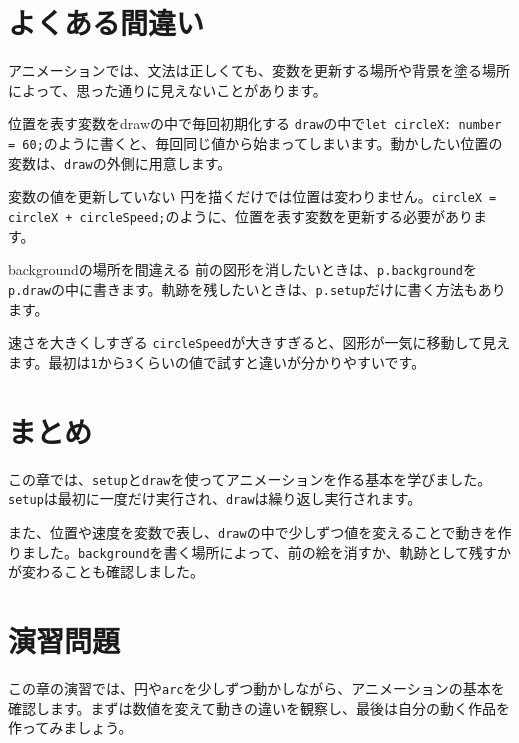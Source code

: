 \section{よくある間違い}

アニメーションでは、文法は正しくても、変数を更新する場所や背景を塗る場所によって、思った通りに見えないことがあります。

\begin{mistakebox}{位置を表す変数をdrawの中で毎回初期化する}
\texttt{draw}の中で\texttt{let circleX: number = 60;}のように書くと、毎回同じ値から始まってしまいます。動かしたい位置の変数は、\texttt{draw}の外側に用意します。
\end{mistakebox}

\begin{mistakebox}{変数の値を更新していない}
円を描くだけでは位置は変わりません。\texttt{circleX = circleX + circleSpeed;}のように、位置を表す変数を更新する必要があります。
\end{mistakebox}

\begin{mistakebox}{backgroundの場所を間違える}
前の図形を消したいときは、\texttt{p.background}を\texttt{p.draw}の中に書きます。軌跡を残したいときは、\texttt{p.setup}だけに書く方法もあります。
\end{mistakebox}

\begin{mistakebox}{速さを大きくしすぎる}
\texttt{circleSpeed}が大きすぎると、図形が一気に移動して見えます。最初は\texttt{1}から\texttt{3}くらいの値で試すと違いが分かりやすいです。
\end{mistakebox}

\section{まとめ}

この章では、\texttt{setup}と\texttt{draw}を使ってアニメーションを作る基本を学びました。\texttt{setup}は最初に一度だけ実行され、\texttt{draw}は繰り返し実行されます。

また、位置や速度を変数で表し、\texttt{draw}の中で少しずつ値を変えることで動きを作りました。\texttt{background}を書く場所によって、前の絵を消すか、軌跡として残すかが変わることも確認しました。

\section{演習問題}

この章の演習では、円や\texttt{arc}を少しずつ動かしながら、アニメーションの基本を確認します。まずは数値を変えて動きの違いを観察し、最後は自分の動く作品を作ってみましょう。

